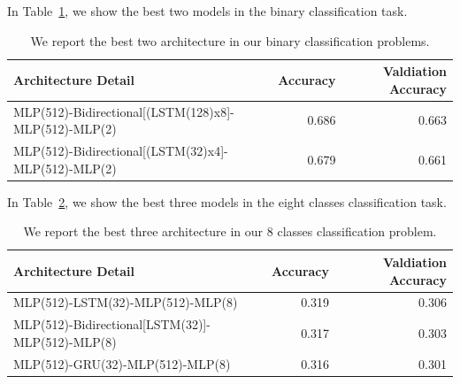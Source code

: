 \documentclass{article}
\begin{document}
In Table~\ref{tab:BinaryResult}, we show the best two models in the binary classification task.
\begin{table}[htbp]
	\centering
	\begin{tabular}{p{20.75em}rr}
		\toprule
		\textbf{Architecture Detail} & \multicolumn{1}{p{4.065em}}{\textbf{Accuracy}} & \multicolumn{1}{p{4.44em}}{\textbf{Valdiation Accuracy}} \\
		\midrule
		MLP(512)-Bidirectional[(LSTM(128)x8]-MLP(512)-MLP(2) & 0.686 & 0.663 \\
		MLP(512)-Bidirectional[(LSTM(32)x4]-MLP(512)-MLP(2) & 0.679 & 0.661 \\
		\bottomrule
	\end{tabular}%
	\vspace{1em}
	\caption{We report the best two architecture in our binary classification problems.}\label{tab:BinaryResult} 
\end{table}
In Table~\ref{tab:MultiClassResult}, we show the best three models in the eight classes classification task.
\begin{table}[htbp]
	\centering
	\begin{tabular}{p{20.75em}rr}
		\toprule
		\textbf{Architecture Detail} & \multicolumn{1}{p{4.065em}}{\textbf{Accuracy}} & \multicolumn{1}{p{4.44em}}{\textbf{Valdiation Accuracy}} \\
		\midrule
		MLP(512)-LSTM(32)-MLP(512)-MLP(8) & 0.319 & 0.306 \\
		MLP(512)-Bidirectional[LSTM(32)]-MLP(512)-MLP(8) & 0.317 & 0.303 \\
		MLP(512)-GRU(32)-MLP(512)-MLP(8) & 0.316 & 0.301 \\
		\bottomrule
	\end{tabular}%
	\vspace{1em}
	\caption{We report the best three architecture in our 8 classes classification problem.}\label{tab:MultiClassResult} 
\end{table}
\end{document}
